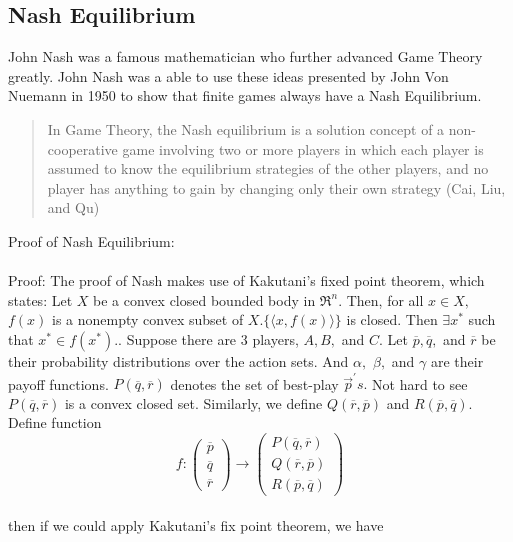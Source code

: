 \documentclass[12pt]{article}
\begin{document}
	\subsection{Nash Equilibrium}
	 John Nash was a famous mathematician who further advanced Game Theory greatly. John Nash was a able to use these ideas presented by John Von Nuemann in 1950 to show that finite games always have a Nash Equilibrium. 
	 \begin{quotation}
		In Game Theory, the Nash equilibrium is a solution concept of a non-cooperative game involving two or more players in which each player is assumed to know the equilibrium strategies of the other players, and no player has anything to gain by changing only their own strategy (Cai, Liu, and Qu)
 	\end{quotation}
 	Proof of Nash Equilibrium:\\
 	\\
 	Proof: The proof of Nash makes use of Kakutani's fixed point theorem, which states: Let $X$ be a convex closed bounded body in $\Re ^ { n } . $ Then, for all $ x \in X ,$
 	$f ( x )$ is a nonempty convex subset of $X . \{ \langle x , f ( x ) \rangle \}$ is closed. Then $\exists x ^ { * }$ such that $x ^ { * } \in f \left( x ^ { * } \right) .$. Suppose there are 3
 	players, $A , B ,$ and $C .$ Let $\overline { p } , \overline { q } ,$ and $\overline { r }$ be their probability distributions over the action sets. And $\alpha ,$
 	$\beta ,$ and $\gamma$ are their payoff functions. $P ( \overline { q } , \overline { r } )$ denotes the set of best-play $\vec { p } ^ { \prime } s .$ Not hard to see $P ( \overline { q } , \overline { r } )$
 	is a convex closed set. Similarly, we define
 	 $Q ( \overline { r } , \overline { p } )$ and
 	  $R ( \overline { p } , \overline { q } ) .$ 
 	  Define function\[f : \left( \begin{array} { c } { \overline { p } } \\ { \overline { q } } \\ { \overline { r } } \end{array} \right) \rightarrow \left( \begin{array} { c } { P ( \overline { q } , \overline { r } ) } \\ { Q ( \overline { r } , \overline { p } ) } \\ { R ( \overline { p } , \overline { q } ) } \end{array} \right)\]
 	\\
 	then if we could apply Kakutani's fix point theorem, we have\\
\end{document}
